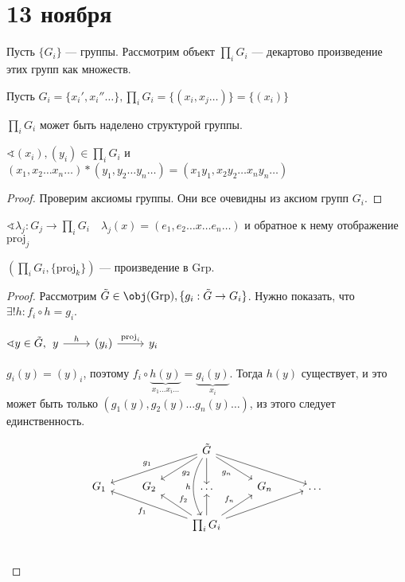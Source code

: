\chapter{13 ноября}

Пусть \(\{G_i\}\) --- группы. Рассмотрим объект \(\prod_i G_i\) --- декартово произведение этих групп как множеств.

Пусть \(G_i = \{x_i', x_i'' \dots \}, \prod_i G_i = \{(x_i, x_j \dots )\} = \{(x_i)\}\)

\begin{lemma}
    \(\prod_i G_i\) может быть наделено структурой группы.

    \(\sphericalangle (x_i), (y_i) \in \prod_i G_i\) и \((x_1, x_2 \dots x_n \dots ) * (y_1, y_2 \dots y_n \dots ) = (x_1y_1, x_2y_2 \dots x_ny_n \dots)\)
\end{lemma}
\begin{proof}
    Проверим аксиомы группы. Они все очевидны из аксиом групп \(G_i\).
\end{proof}

\(\sphericalangle \lambda_j : G_j \to \prod_i G_i \quad \lambda_j(x) = (e_1, e_2 \dots x \dots e_n \dots)\) и обратное к нему отображение \(\mathrm{proj}_j\)

\begin{lemma}
    \((\prod_i G_i, \{\mathrm{proj}_k\})\) --- произведение в \(\mathrm{Grp}\).
\end{lemma}
\begin{proof}
    Рассмотрим \(\tilde{G} \in \obj(\mathrm{Grp}), \{g_i : \tilde{G} \to G_i\}\). Нужно показать, что \(\exists! h : f_i \circ h = g_i\).

    \(\sphericalangle y \in \tilde{G}, \begin{tikzcd}
        y \arrow{r}{h} & (y_i) \arrow{r}{\mathrm{proj}_i} & y_i
    \end{tikzcd}\)

    \(g_i(y) = (y)_i\), поэтому \(f_i \circ \underbrace{h(y)}_{x_1 \dots x_i \dots } = \underbrace{g_i (y)}_{x_i}\). Тогда \(h(y)\) существует, и это может быть только \((g_1(y), g_2(y) \dots g_n(y) \dots)\), из этого следует единственность.

    \[\begin{tikzcd}
            & & \tilde{G} \arrow[bend right = 30, swap]{dd}{h} \arrow[swap]{d}\arrow{ld}{g_2}\arrow[swap]{lld}{g_1}\arrow[swap]{rd}{g_n}\arrow{rrd} & & \\
            G_1 & G_2 & \dots & G_n & \dots \\
            & & \prod_i G_i \arrow{u}\arrow[swap]{lu}{f_2}\arrow{llu}{f_1}\arrow{ru}{f_n}\arrow{rru} & & \\
        \end{tikzcd}\]
\end{proof}

